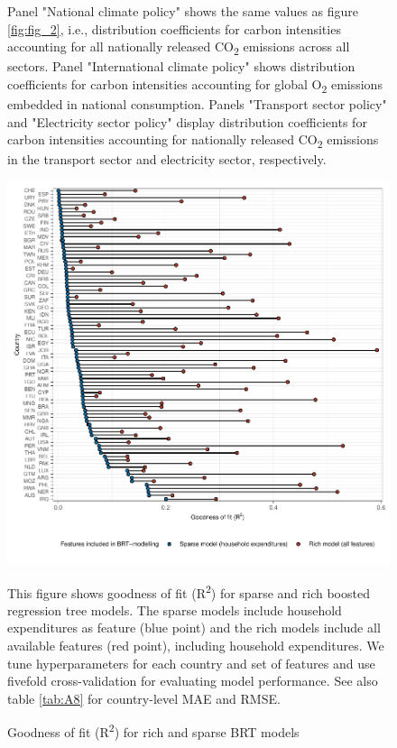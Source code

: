 \documentclass[12pt, a4paper]{article}
\newenvironment{subcaption2}
{\strut
\vspace{-5pt}
\begin{minipage}[b]{0.95\textwidth}
  \hspace*{-\parindent}
  \footnotesize}
 {\end{minipage}}
\begin{document}
\begin{refsection}
\begin{figure}[ht!]
\begin{subcaption2}
    Panel "National climate policy" shows the same values as figure \ref{fig:fig_2}, i.e., distribution coefficients for carbon intensities accounting for all nationally released CO\textsubscript{2} emissions across all sectors. Panel "International climate policy" shows distribution coefficients for carbon intensities accounting for global  O\textsubscript{2} emissions embedded in national consumption. Panels "Transport sector policy" and "Electricity sector policy" display distribution coefficients for carbon intensities accounting for nationally released CO\textsubscript{2} emissions in the transport sector and electricity sector, respectively.
    \end{subcaption2}
\end{figure}
\clearpage

\begin{figure}[ht!]
    \centering
    \includegraphics[width=\textwidth]{1_Figures/Figures_Appendix/Figure_Comparison_Models.pdf}
    \caption{Goodness of fit (R\textsuperscript{2}) for rich and sparse BRT models}\label{fig:comparison}
    \label{fig:comparison_models}
    \begin{subcaption2}
    This figure shows goodness of fit (R\textsuperscript{2}) for sparse and rich boosted regression tree models. The sparse models include household expenditures as feature (blue point) and the rich models include all available features (red point), including household expenditures. We tune hyperparameters for each country and set of features and use fivefold cross-validation for evaluating model performance. See also table \ref{tab:A8} for country-level MAE and RMSE.
    \end{subcaption2}
\end{figure}


\end{refsection}
\end{document}
